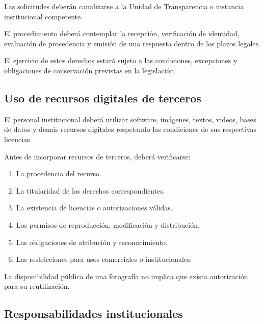 \documentclass[12pt]{article}
\begin{document}
Las solicitudes deberán
canalizarse a la Unidad
de Transparencia o instancia
institucional competente.

El procedimiento deberá
contemplar la recepción,
verificación de identidad,
evaluación de procedencia
y emisión de una respuesta
dentro de los plazos legales.

El ejercicio de estos derechos
estará sujeto a las condiciones,
excepciones y obligaciones
de conservación previstas
en la legislación.

\subsection{Uso de recursos digitales de terceros}

El personal institucional
deberá utilizar software,
imágenes, textos, videos,
bases de datos y demás
recursos digitales respetando
las condiciones de sus
respectivas licencias.

Antes de incorporar recursos
de terceros, deberá verificarse:

\begin{enumerate}
    \item La procedencia del recurso.

    \item La titularidad de los
    derechos correspondientes.

    \item La existencia de licencias
    o autorizaciones válidas.

    \item Los permisos de reproducción,
    modificación y distribución.

    \item Las obligaciones de
    atribución y reconocimiento.

    \item Las restricciones para
    usos comerciales o institucionales.
\end{enumerate}

La disponibilidad pública
de una fotografía no implica
que exista autorización para
su reutilización.

\subsection{Responsabilidades institucionales}
\end{document}
